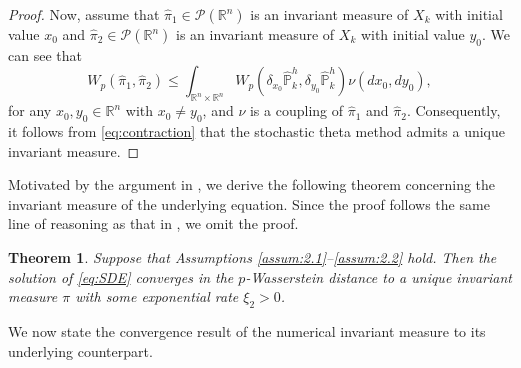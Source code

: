 \documentclass{article}
\newtheorem{theorem}{Theorem}[section]
\begin{document}
\begin{proof}
Now, assume that $\hat{\pi}_1 \in \mathcal{P}(\mathbb{R}^n)$ is an invariant measure of $X_k$ with initial value $x_0$ and $\hat{\pi}_2 \in \mathcal{P}(\mathbb{R}^n)$ is an invariant measure of $X_k$ with initial value $y_0$. We can see that
\[
W_p(\hat{\pi}_1, \hat{\pi}_2) \leq \int_{\mathbb{R}^n \times \mathbb{R}^n} W_p(\delta_{x_0} \hat{\mathbb{P}}_k^h, \delta_{y_0} \hat{\mathbb{P}}_k^h) \nu(dx_0, dy_0),
\]
for any $x_0,y_0\in\mathbb{R}^n$ with $x_0\neq y_0$, and $\nu$ is a  coupling of $\hat{\pi}_1$ and $\hat{\pi}_2$. Consequently, it follows from \eqref{eq:contraction} that the stochastic theta method admits a unique invariant measure.
\end{proof}

Motivated by the argument in \cite{BaoShaoYuan2016}, we derive the following theorem concerning the invariant measure of the underlying equation. Since the proof follows the same line of reasoning as that in \cite{BaoShaoYuan2016}, we omit the proof.

\begin{theorem}\label{thm:2}
Suppose that Assumptions \ref{assum:2.1}--\ref{assum:2.2} hold. Then the solution of \eqref{eq:SDE} converges in the $p$-Wasserstein distance to a unique invariant measure $\pi$ with some exponential rate $\xi_2>0$.
\end{theorem}

We now state the convergence result of the numerical invariant measure to its underlying counterpart.
\end{document}
